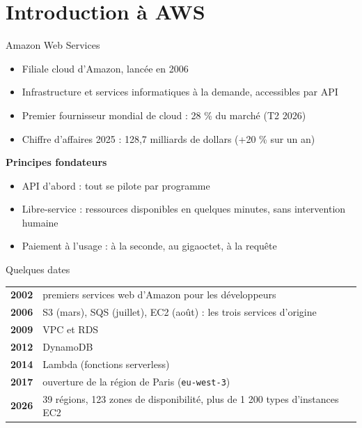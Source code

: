 \section{Introduction à AWS}

\begin{frame}{Amazon Web Services}
  \begin{itemize}
    \setlength{\itemsep}{.55em}
    \item Filiale cloud d'Amazon, lancée en 2006
    \item Infrastructure et services informatiques à la demande, accessibles par API
    \item Premier fournisseur mondial de cloud : 28 \% du marché (T2 2026)
    \item Chiffre d'affaires 2025 : 128,7 milliards de dollars (+20 \% sur un an)
  \end{itemize}
  \bigskip
  \textbf{Principes fondateurs}
  \begin{itemize}
    \item API d'abord : tout se pilote par programme
    \item Libre-service : ressources disponibles en quelques minutes, sans intervention humaine
    \item Paiement à l'usage : à la seconde, au gigaoctet, à la requête
  \end{itemize}
\end{frame}

\begin{frame}{Quelques dates}
  \renewcommand{\arraystretch}{1.3}
  \begin{tabular}{@{}l l@{}}
    \textbf{2002} & premiers services web d'Amazon pour les développeurs \\
    \textbf{2006} & S3 (mars), SQS (juillet), EC2 (août) : les trois services d'origine \\
    \textbf{2009} & VPC et RDS \\
    \textbf{2012} & DynamoDB \\
    \textbf{2014} & Lambda (fonctions serverless) \\
    \textbf{2017} & ouverture de la région de Paris (\texttt{eu-west-3}) \\
    \textbf{2026} & 39 régions, 123 zones de disponibilité, plus de 1 200 types d'instances EC2 \\
  \end{tabular}
\end{frame}

